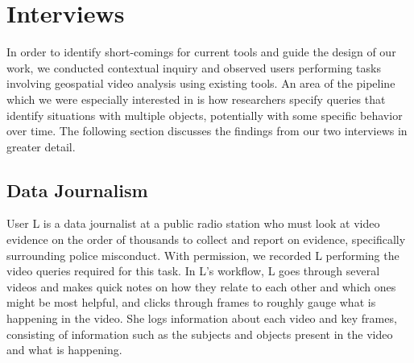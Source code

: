 
\section{Interviews}

In order to identify short-comings for current tools and guide the design of our work, we conducted contextual inquiry and observed users performing tasks involving geospatial video analysis using existing tools. An area of the pipeline which we were especially interested in is how researchers specify queries that identify situations with multiple objects, potentially with some specific behavior over time. The following section discusses the findings from our two interviews in greater detail.








\subsection{Data Journalism}
User L is a data journalist at a public radio station who must look at video evidence on the order of thousands to collect and report on evidence, specifically surrounding police misconduct. With permission, we recorded L performing the video queries required for this task. In L's workflow, L goes through several videos and makes quick notes on how they relate to each other and which ones might be most helpful, and clicks through frames to roughly gauge what is happening in the video. She logs information about each video and key frames, consisting of information such as the subjects and objects present in the video and what is happening.

